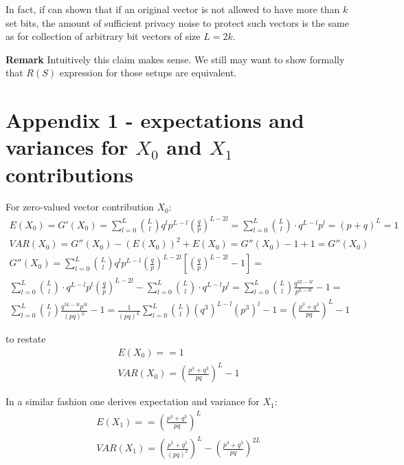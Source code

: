 \documentclass[11pt]{article}
\begin{document}
In fact, if can shown that if an original vector is not allowed to have more than $k$ set bits, the amount of sufficient privacy noise to protect such vectors is the same as for collection of arbitrary bit vectors of size $L = 2k$. 

\textbf{Remark}  Intuitively this claim makes sense.  We still may want to show formally that $R(S)$ expression for those setups are equivalent. 


\section{Appendix 1 - expectations and variances for $X_0$ and $X_1$ contributions}

For zero-valued vector contribution $X_0$:
\begin{align}
E(X_0)=  G'(X_0) = \sum_{l=0}^{L} \binom{L}{l} q^lp^{L-l} \left ( \frac{q}{p} \right )^ {L - 2l} = \sum_{l=0}^{L}  \binom{L}{l} \cdot q^{L-l}p^{l} = (p+q)^L = 1 \\
VAR(X_0)=  G''(X_0) - (E(X_0))^2 + E(X_0) = G''(X_0) - 1 + 1 =  G''(X_0) \\
 G''(X_0) = \sum_{l=0}^{L} \binom{L}{l} q^lp^{L-l} \left ( \frac{q}{p} \right )^ {L - 2l} \left [  \left ( \frac{q}{p} \right )^ {L - 2l} - 1 \right ] = \\
  \sum_{l=0}^{L}  \binom{L}{l} \cdot q^{L-l}p^{l}  \left ( \frac{q}{p} \right )^ {L - 2l}  - \sum_{l=0}^{L}  \binom{L}{l} \cdot q^{L-l}p^{l}  =   \sum_{l=0}^{L}  \binom{L}{l}   \frac{q^{2L-3l}}{p^{L-3l}}  - 1 = \\
\sum_{l=0}^{L}  \binom{L}{l}   \frac{q^{3L-3l} p^{3l}}{(pq)^{L}} - 1 =  \frac{1}{(pq)^{L}} \sum_{l=0}^{L}  \binom{L}{l}   (q^3)^{L-l} (p^3)^{l} - 1 = \left ( \frac{p^3 + q^3}{pq} \right )^L - 1
\end{align}

to restate
\begin{align}
E(X_0)=  = 1 \\
VAR(X_0) = \left ( \frac{p^3 + q^3}{pq} \right )^L - 1
\end{align}

In a similar fashion one derives expectation and variance for $X_1$:
\begin{align}
E(X_1)=  =   \left ( \frac{p^3 + q^3}{pq} \right )^L\\
VAR(X_1) = \left ( \frac{p^5 + q^5}{(pq)^2} \right )^{L}  - \left ( \frac{p^3 + q^3}{pq} \right )^{2L} 
\end{align}
\end{document}
